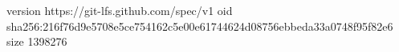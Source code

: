version https://git-lfs.github.com/spec/v1
oid sha256:216f76d9e5708e5ce754162c5e00e61744624d08756ebbeda33a0748f95f82e6
size 1398276

